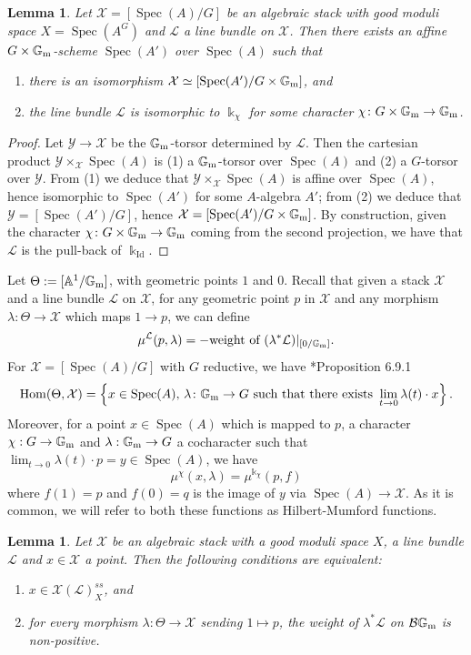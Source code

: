 \documentclass{amsart}
\newcommand{\bA}{\mathbb{A}}
\newcommand{\bG}{\mathbb{G}}
\newcommand{\cB}{\mathcal{B}}
\newcommand{\cL}{\mathcal{L}}
\newcommand{\cX}{\mathcal{X}}
\newcommand{\cY}{\mathcal{Y}}
\newcommand{\spec}{\operatorname{Spec}}
\newcommand{\Hom}{\operatorname{Hom}}
\newcommand{\Gm}{\bG_{{\rm m}}}
\newcommand{\Id}{\operatorname{Id}}
\newtheorem{Lemma}[theorem]{Lemma}
\theoremstyle{definition}
\theoremstyle{definition}
\begin{document}
{\begin{Lemma}\label{lm:character bundle}
    Let $\cX=[\spec(A)/G]$ be an algebraic stack with good moduli space $X=\spec(A^G)$ and $\cL$ a line bundle on $\cX$. Then there exists an affine $G\times \Gm$-scheme $\spec(A')$ over $\spec(A)$ such that
    \begin{enumerate}
        \item there is an isomorphism $\cX\simeq[\spec(A')/G\times \Gm]$, and
        \item the line bundle $\cL$ is isomorphic to $\Bbbk_\chi$ for some character $\chi\colon G\times \Gm\to\Gm$.
    \end{enumerate}
\end{Lemma}
\begin{proof}
    Let $\cY\to \cX$ be the $\Gm$-torsor determined by $\cL$. Then the cartesian product $\cY \times_{\cX} \spec(A)$ is (1) a $\Gm$-torsor over $\spec(A)$ and (2) a $G$-torsor over $\cY$. From (1) we deduce that $\cY \times_{\cX} \spec(A)$ is affine over $\spec(A)$, hence isomorphic to $\spec(A')$ for some $A$-algebra $A'$; from (2) we deduce that $\cY=[\spec(A')/G]$, hence $\cX=[\spec(A')/G\times \Gm]$.
    By construction, given the character $\chi\colon G\times \Gm \to \Gm$ coming from the second projection, we have that $\cL$ is the pull-back of $\Bbbk_{\Id}$.
\end{proof}
Let $\Theta:=[\bA^1/\Gm]$, with geometric points $1$ and $0$.
Recall that given a stack $\cX$ and a line bundle $\cL$ on $\cX$, for any geometric point $p$ in $\cX$ and any morphism $\lambda\colon\Theta\to\cX$ which maps $1\to p$, we can define
\[\mu^{\cL}(p,\lambda)=-\text{weight of }(\lambda^*\cL)|_{[0/\Gm]}.\]
For $\cX=[\spec(A)/G]$ with $G$ reductive, we have \cite{Alp21}*{Proposition 6.9.1}
\[ \Hom(\Theta,\cX) = \left\{ x \in \spec(A)\text{, }\lambda\colon\Gm\to G \text{ such that there exists }\lim_{t\to 0}\lambda(t)\cdot x\right\}.\]
Moreover, for a point $x\in \spec(A)$ which is mapped to $p$, a character $\chi:G\to\Gm$ and $\lambda:\Gm\to G$ a cocharacter such that $\lim_{t\to 0}\lambda(t)\cdot p = y \in \spec(A)$, we have
\[ \mu^\chi(x,\lambda) = \mu^{\Bbbk_\chi}(p,f)\]
where $f(1)=p$ and $f(0)=q$ is the image of $y$ via $\spec(A)\to\cX$. As it is common, we will refer to both these functions as Hilbert-Mumford functions.
\begin{Lemma}\label{lemma_relative_GIT_for_gms_can_be_checked_using_HM}
     Let $\cX$ be an algebraic stack with a good moduli space $X$, a line bundle $\cL$ and $x\in \cX$ a point. Then the following conditions are equivalent:
     \begin{enumerate}
         \item $x\in \cX(\cL)^{ss}_X$, and
         \item for every morphism $\lambda:\Theta\to \cX$ sending $1\mapsto p$, the weight of $\lambda^*\cL$ on $\cB\Gm$ is non-positive.
     \end{enumerate}
     

\end{Lemma}}
\end{document}
